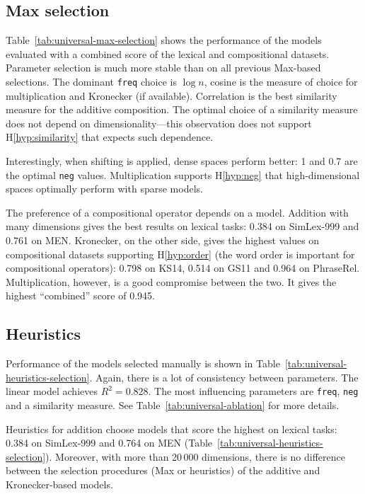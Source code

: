 \subsection{Max selection}
\label{sec:max-selection-universal}

Table~\ref{tab:universal-max-selection} shows the performance of the models evaluated with a combined score of the lexical and compositional datasets.
Parameter selection is much more stable than on all previous Max-based selections. The dominant \texttt{freq} choice is $\log n$, cosine is the measure of choice for multiplication and Kronecker (if available). Correlation is the best similarity measure for the additive composition. The optimal choice of a similarity measure does not depend on dimensionality---this observation does not support H\ref{hyp:similarity} that expects such dependence.

Interestingly, when shifting is applied, dense spaces perform better: 1 and 0.7 are the optimal \texttt{neg} values. Multiplication supports H\ref{hyp:neg} that high-dimensional spaces optimally perform with sparse models.



The preference of a compositional operator depends on a model. Addition with many dimensions gives the best results on lexical tasks: 0.384 on SimLex-999 and 0.761 on MEN. Kronecker, on the other side, gives the highest values on compositional datasets supporting H\ref{hyp:order} (the word order is important for compositional operators): 0.798 on KS14, 0.514 on GS11 and 0.964 on PhraseRel. Multiplication, however, is a good compromise between the two. It gives the highest ``combined'' score of 0.945.

\subsection{Heuristics}
\label{sec:heuristics-universal}

Performance of the models selected manually is shown in Table~\ref{tab:universal-heuristics-selection}. Again, there is a lot of consistency between parameters. The linear model achieves $R^2 = 0.828$. The most influencing parameters are \texttt{freq}, \texttt{neg} and a similarity measure. See Table~\ref{tab:universal-ablation} for more details.

Heuristics for addition choose models that score the highest on lexical tasks: 0.384 on SimLex-999 and 0.764 on MEN (Table~\ref{tab:universal-heuristics-selection}). Moreover, with more than 20\,000 dimensions, there is no difference between the selection procedures (Max or heuristics) of the additive and Kronecker-based models.

